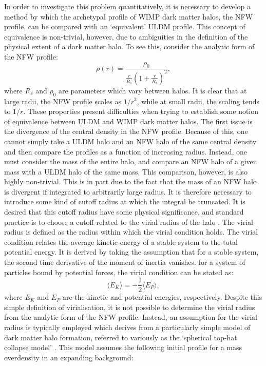 In order to investigate this problem quantitatively, it is necessary to develop a method by which the archetypal profile of WIMP dark matter halos, the NFW profile, can be compared with an `equivalent' ULDM profile. This concept of equivalence is non-trivial, however, due to ambiguities in the definition of the physical extent of a dark matter halo. To see this, consider the analytic form of the NFW profile:
\begin{equation}
    \rho(r)=\frac{\rho_0}{\frac{r}{R_s}\left(1+\frac{r}{R_s}\right)^2},
\end{equation}
where $R_s$ and $\rho_0$ are parameters which vary between halos. It is clear that at large radii, the NFW profile scales as $1/r^3$, while at small radii, the scaling tends to $1/r$. These properties present difficulties when trying to establish some notion of equivalence between ULDM and WIMP dark matter halos. The first issue is the divergence of the central density in the NFW profile. Because of this, one cannot simply take a ULDM halo and an NFW halo of the same central density and then compare the profiles as a function of increasing radius. Instead, one must consider the mass of the entire halo, and compare an NFW halo of a given mass with a ULDM halo of the same mass. This comparison, however, is also highly non-trivial. This is in part due to the fact that the mass of an NFW halo is divergent if integrated to arbitrarily large radius. It is therefore necessary to introduce some kind of cutoff radius at which the integral be truncated. It is desired that this cutoff radius have some physical significance, and standard practice is to choose a cutoff related to the virial radius of the halo \cite{White:2000jv}. The virial radius is defined as the radius within which the virial condition holds. The virial condition relates the average kinetic energy of a stable system to the total potential energy. It is derived by taking the assumption that for a stable system, the second time derivative of the moment of inertia vanishes. for a system of particles bound by potential forces, the virial condition can be stated as:
\begin{equation}
    \langle E_K\rangle = -\frac{1}{2}\langle E_P\rangle,
\end{equation}
where $E_K$ and $E_P$ are the kinetic and potential energies, respectively. Despite this simple definition of virialisation, it is not possible to determine the virial radius from the analytic form of the NFW profile. Instead, an assumption for the virial radius is typically employed which derives from a particularly simple model of dark matter halo formation, referred to variously as the `spherical top-hat collapse model' \cite{Herrera:2017epn}. This model assumes the following initial profile for a mass overdensity in an expanding background:
